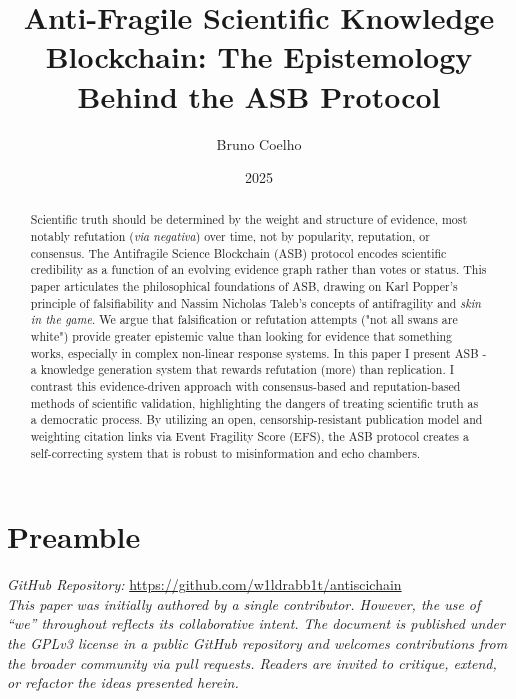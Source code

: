 \documentclass{article}
\title{Anti-Fragile Scientific Knowledge Blockchain: The Epistemology Behind the ASB Protocol}
\author{Bruno Coelho}
\date{2025}
\begin{document}
\maketitle

\begin{abstract}
Scientific truth should be determined by the weight and structure of evidence, most notably refutation (\emph{via negativa}) over time, not by popularity, reputation, or consensus. 
The Antifragile Science Blockchain (ASB) protocol encodes scientific credibility as a function of an evolving evidence graph rather than votes or status. 
This paper articulates the philosophical foundations of ASB, drawing on Karl Popper's principle of falsifiability and Nassim Nicholas Taleb's concepts of antifragility and \emph{skin in the game}. We argue that falsification or refutation attempts ("not all swans are white") provide greater epistemic value than looking for evidence that something works, especially in complex non-linear response systems. 
In this paper I present ASB - a knowledge generation system that rewards refutation (more) than replication. I contrast this evidence-driven approach with consensus-based and reputation-based methods of scientific validation, highlighting the dangers of treating scientific truth as a democratic process. By utilizing an open, censorship-resistant publication model and weighting citation links via Event Fragility Score (EFS), the ASB protocol creates a self-correcting system that is robust to misinformation and echo chambers. 
\end{abstract}

\section*{Preamble}
\textit{GitHub Repository:} \url{https://github.com/w1ldrabb1t/antiscichain}\\

\textit{This paper was initially authored by a single contributor. However, the use of “we” throughout reflects its collaborative intent. The document is published under the GPLv3 license in a public GitHub repository and welcomes contributions from the broader community via pull requests. Readers are invited to critique, extend, or refactor the ideas presented herein.}
\end{document}
